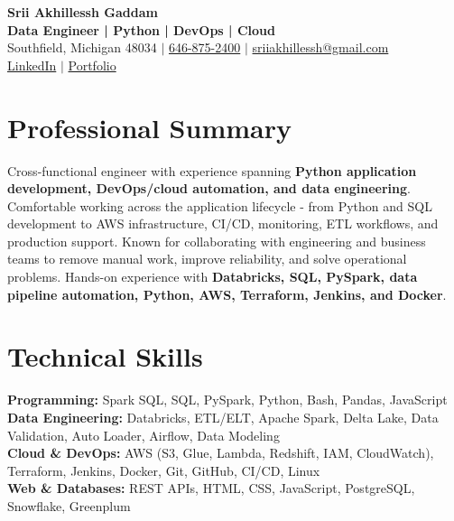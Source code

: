 \documentclass[letterpaper,10pt]{article}
\begin{document}
\fontsize{9.35pt}{10.45pt}\selectfont

\begin{center}
    {\LARGE \textbf{Srii Akhillessh Gaddam}} \\[-1pt]
    \textbf{Data Engineer | Python | DevOps | Cloud} \\[2pt]
    Southfield, Michigan 48034 $|$
    \href{tel:6468752400}{646-875-2400} $|$
    \href{mailto:sriiakhillessh@gmail.com}{sriiakhillessh@gmail.com} \\[1pt]
    \href{https://www.linkedin.com/in/srii-akhiilessh-gaddam-b48668191/}{LinkedIn} $|$
    \href{https://sriiakhillesshg.github.io/portfolio/}{Portfolio}
\end{center}
\vspace{-8pt}

\section{Professional Summary}
\small{Cross-functional engineer with experience spanning \textbf{Python application development, DevOps/cloud automation, and data engineering}. Comfortable working across the application lifecycle - from Python and SQL development to AWS infrastructure, CI/CD, monitoring, ETL workflows, and production support. Known for collaborating with engineering and business teams to remove manual work, improve reliability, and solve operational problems. Hands-on experience with \textbf{Databricks, SQL, PySpark, data pipeline automation, Python, AWS, Terraform, Jenkins, and Docker}.}

\section{Technical Skills}
\small{
\textbf{Programming:} Spark SQL, SQL, PySpark, Python, Bash, Pandas, JavaScript \\
\textbf{Data Engineering:} Databricks, ETL/ELT, Apache Spark, Delta Lake, Data Validation, Auto Loader, Airflow, Data Modeling \\
\textbf{Cloud \& DevOps:} AWS (S3, Glue, Lambda, Redshift, IAM, CloudWatch), Terraform, Jenkins, Docker, Git, GitHub, CI/CD, Linux \\
\textbf{Web \& Databases:} REST APIs, HTML, CSS, JavaScript, PostgreSQL, Snowflake, Greenplum
}

\end{document}
